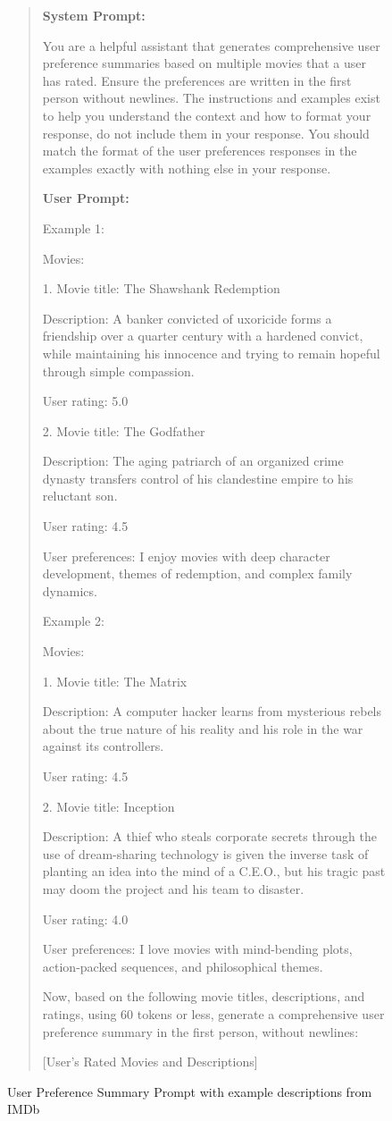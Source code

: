 \documentclass[sigconf]{acmart}
\begin{document}
\begin{figure*} \begin{mdframed}[linewidth=1pt] \begin{quote}\footnotesize

\textbf{System Prompt:}

You are a helpful assistant that generates comprehensive user preference summaries based on multiple movies that a user has rated. Ensure the preferences are written in the first person without newlines. The instructions and examples exist to help you understand the context and how to format your response, do not include them in your response. You should match the format of the user preferences responses in the examples exactly with nothing else in your response.

\textbf{User Prompt:}

Example 1:

Movies:

1. Movie title: The Shawshank Redemption

   Description: A banker convicted of uxoricide forms a friendship over a quarter century with a hardened convict, while maintaining his innocence and trying to remain hopeful through simple compassion.
   
   User rating: 5.0

2. Movie title: The Godfather

   Description: The aging patriarch of an organized crime dynasty transfers control of his clandestine empire to his reluctant son.
   
   User rating: 4.5

User preferences: I enjoy movies with deep character development, themes of redemption, and complex family dynamics.

Example 2:

Movies:

1. Movie title: The Matrix

   Description: A computer hacker learns from mysterious rebels about the true nature of his reality and his role in the war against its controllers.
   
   User rating: 4.5

2. Movie title: Inception

   Description: A thief who steals corporate secrets through the use of dream-sharing technology is given the inverse task of planting an idea into the mind of a C.E.O., but his tragic past may doom the project and his team to disaster.
   
   User rating: 4.0

User preferences: I love movies with mind-bending plots, action-packed sequences, and philosophical themes.

Now, based on the following movie titles, descriptions, and ratings, using 60 tokens or less, generate a comprehensive user preference summary in the first person, without newlines:

[User's Rated Movies and Descriptions]
\end{quote} 
\end{mdframed} 
\caption{User Preference Summary Prompt with example descriptions from IMDb} 
\label{fig:User_Preference_Generation}
\end{figure*}
\end{document}
